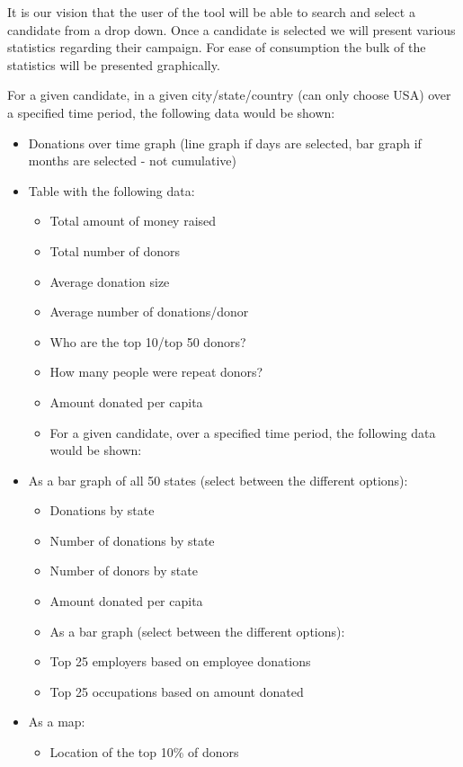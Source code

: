 \documentclass[12pt]{article}
\begin{document}
It is our vision that the user of the tool will be able to search and select a candidate from a drop down. Once a candidate is selected we will present various statistics regarding their campaign. For ease of consumption the bulk of the statistics will be presented graphically.

For a given candidate, in a given city/state/country (can only choose USA) over a specified time period, the following data would be shown:
\begin{itemize}
\item Donations over time graph (line graph if days are selected, bar graph if months are selected - not cumulative)
\item Table with the following data:
    \begin{itemize}
        \item Total amount of money raised
        \item Total number of donors
        \item Average donation size
        \item Average number of donations/donor
        \item Who are the top 10/top 50 donors?
        \item How many people were repeat donors?
        \item Amount donated per capita
        \item For a given candidate, over a specified time period, the following data would be shown:
    \end{itemize}
\item As a bar graph of all 50 states (select between the different options):
    \begin{itemize}
        \item Donations by state
        \item Number of donations by state
        \item Number of donors by state
        \item Amount donated per capita
    \end{itemize}

    \begin{itemize}
        \item As a bar graph (select between the different options):
        \item Top 25 employers based on employee donations
        \item Top 25 occupations based on amount donated
    \end{itemize}
\item As a map:
    \begin{itemize}
        \item Location of the top 10\% of donors
    \end{itemize}


\end{itemize}
\end{document}
